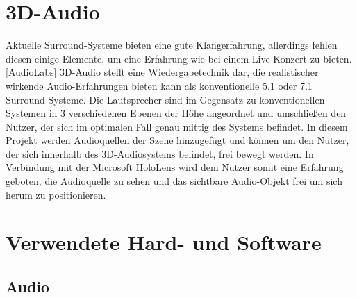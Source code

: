 \documentclass[11pt, titlepage, fleqn]{report}
\begin{document}
        \section{3D-Audio}
            Aktuelle Surround-Systeme bieten eine gute Klangerfahrung, allerdings fehlen diesen einige Elemente, um eine Erfahrung wie bei einem Live-Konzert zu bieten.  [AudioLabs]\newline
            3D-Audio stellt eine Wiedergabetechnik dar, die realistischer wirkende Audio-Erfahrungen bieten kann als konventionelle 5.1 oder 7.1 Surround-Systeme.
            Die Lautsprecher sind im Gegensatz zu konventionellen Systemen in 3 verschiedenen Ebenen der Höhe angeordnet und umschließen den Nutzer, der sich im optimalen Fall genau mittig des Systems befindet.
            In diesem Projekt werden Audioquellen der Szene hinzugefügt und können um den Nutzer, der sich innerhalb des 3D-Audiosystems befindet, frei bewegt werden. In Verbindung mit der Microsoft 
            HoloLens wird dem Nutzer somit eine Erfahrung geboten, die Audioquelle zu sehen und das sichtbare Audio-Objekt frei um sich herum zu positionieren.       
        \label{sec:2.2}
   
        \section{Verwendete Hard- und Software}
        \label{sec:2.3}
            \subsection{Audio}
            \label{sec:2.3.1Audio}
\end{document}
